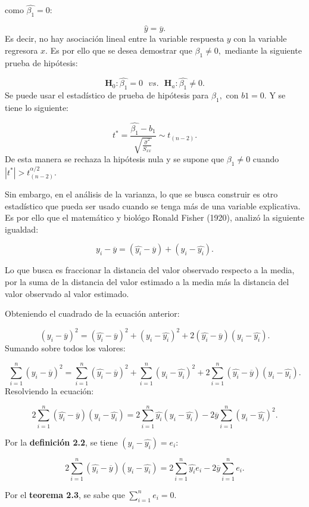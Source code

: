 \documentclass[
  a4paper,
  oneside,
  openany]{book}
\begin{document}
como \(\hat{\beta_{1}}=0:\)

\[\hat{y}=\overline{y}.\]
Es decir, no hay asociación lineal entre la variable respuesta \(y\) con la variable regresora \(x\). Es por ello que se desea demostrar que \(\beta_{1}\neq 0,\) mediante la siguiente prueba de hipótesis:

\[\textbf{H}_0:\hat{\beta_{1}}=0 \ \ \ vs. \ \ \ \textbf{H}_a:\hat{\beta_{1}} \neq 0.\]
Se puede usar el estadístico de prueba de hipótesis para \(\beta_{1},\) con \(b1=0\). Y se tiene lo siguiente:

\[t^*=\frac{\hat{\beta_{1}}-b_{1}}{\sqrt{\frac{\hat{\sigma}^2}{S_{xx}}}} \sim t_{(n-2)}.\]
De esta manera se rechaza la hipótesis nula y se supone que \(\beta_{1}\neq 0\) cuando \(|t^*|>t^{\alpha/2}_{(n-2)}\).

Sin embargo, en el análisis de la varianza, lo que se busca construir es otro estadístico que pueda ser usado cuando se tenga más de una variable explicativa. Es por ello que el matemático y biológo Ronald Fisher (1920), analizó la siguiente igualdad:

\[y_{i}-\overline{y}=(\hat{y_{i}}-\overline{y})+(y_{i}-\hat{y_{i}}).\]

Lo que busca es fraccionar la distancia del valor observado respecto a la media, por la suma de la distancia del valor estimado a la media más la distancia del valor observado al valor estimado.

Obteniendo el cuadrado de la ecuación anterior:

\[(y_{i}-\overline{y})^2=(\hat{y_{i}}-\overline{y})^2+(y_{i}-\hat{y_{i}})^2+2(\hat{y_{i}}-\overline{y})(y_{i}-\hat{y_{i}}).\]
Sumando sobre todos los valores:

\[\sum_{i=1}^{n}(y_{i}-\overline{y})^2=\sum_{i=1}^{n}(\hat{y_{i}}-\overline{y})^2+\sum_{i=1}^{n}(y_{i}-\hat{y_{i}})^2+2\sum_{i=1}^{n}(\hat{y_{i}}-\overline{y})(y_{i}-\hat{y_{i}}).\]
Resolviendo la ecuación:

\[2\sum_{i=1}^{n}(\hat{y_{i}}-\overline{y})(y_{i}-\hat{y_{i}})=2\sum_{i=1}^{n}\hat{y_{i}}(y_{i}-\hat{y_{i}})-2\overline{y}\sum_{i=1}^{n}(y_{i}-\hat{y_{i}})^2.\]

Por la \textbf{definición 2.2}, se tiene \((y_{i}-\hat{y_{i}})=e_{i}\):

\[2\sum_{i=1}^{n}(\hat{y_{i}}-\overline{y})(y_{i}-\hat{y_{i}})=2\sum_{i=1}^{n}\hat{y_{i}}e_{i}-2\overline{y}\sum_{i=1}^{n}e_{i}.\]

Por el \textbf{teorema 2.3}, se sabe que \(\sum_{i=1}^{n}e_{i}=0.\)
\end{document}

